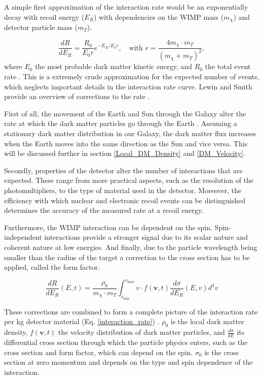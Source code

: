 \documentclass{article}
\begin{document}
A simple first approximation of the interaction rate would be an exponentially decay with recoil energy ($E_R$) with dependencies on the WIMP mass ($m_\chi$) and detector particle mass ($m_T$). 

\begin{equation}
    \frac{dR}{dE_R} = \frac{R_0}{E_0 r} e^{-E_R/E_0r}, \quad \mbox{with } r = \frac{4m_{\chi} \cdot m_T}{(m_{\chi} + m_T)^2}, 
\end{equation}
where $E_0$ the most probable dark matter kinetic energy, and $R_0$ the total event rate \cite{Lewin:1995rx}. This is a extremely crude approximation for the expected number of events, which neglects important details in the interaction rate curve. Lewin and Smith provide an overview of corrections to the rate \cite{Lewin:1995rx}. 

First of all, the movement of the Earth and Sun through the Galaxy alter the rate at which the dark matter particles go through the Earth \cite{Spergel:1987kx}. Assuming a stationary dark matter distribution in our Galaxy, the dark matter flux increases when the Earth moves into the same direction as the Sun and vice versa. This will be discussed further in section \ref{Local_DM_Density} and \ref{DM_Velocity}.

Secondly, properties of the detector alter the number of interactions that are expected. These range from more practical aspects, such as the resolution of the photomultipliers, to the type of material used in the detector. Moreover, the efficiency with which nuclear and electronic recoil events can be distinguished determines the accuracy of the measured rate at a recoil energy.

Furthermore, the WIMP interaction can be dependent on the spin. Spin-independent interactions provide a stronger signal due to its scalar nature and coherent nature at low energies. And finally, due to the particle wavelength being smaller than the radius of the target a correction to the cross section has to be applied, called the form factor.

\begin{equation} \label{interaction_rate}
    \frac{dR}{dE_R}(E,t) = \frac{\rho_0}{m_\chi \cdot m_T} \int_{v_\text{min}}^{v_\text{max}} v \cdot f(\textbf{v},t) \frac{d \sigma}{dE_R} (E, v)d^3v
\end{equation}

These corrections are combined to form a complete picture of the interaction rate per kg detector material (Eq. \ref{interaction_rate}) \cite{Lewin:1995rx, Undagoitia:2015gya}. $\rho_0$ is the local dark matter density, $f(\mathbf{v}, t)$ the velocity distribution of dark matter particles, and $\tfrac{d\sigma}{dE}$ its differential cross section through which the particle physics enters, such as the cross section and form factor, which can depend on the spin. $\sigma_0$ is the cross section at zero momentum and depends on the type and spin dependence of the interaction.
\end{document}
